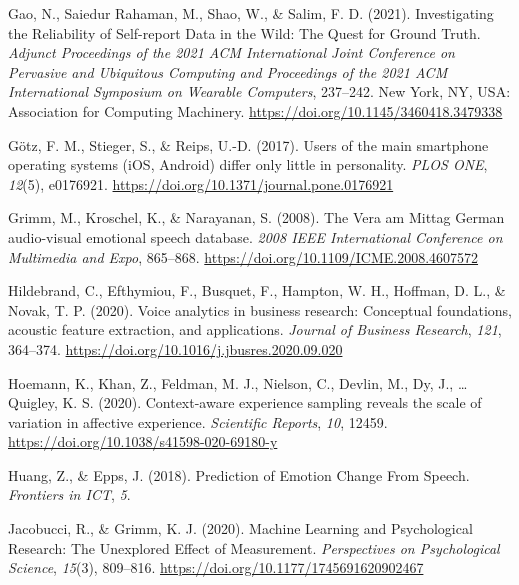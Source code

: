 \documentclass[
  man,floatsintext]{apa6}
\newlength{\cslhangindent}
\newlength{\cslentryspacingunit} %
\newenvironment{CSLReferences}[2] %
 {%
  \setlength{\parindent}{0pt}
  \ifodd #1
  \let\oldpar\par
  \def\par{\hangindent=\cslhangindent\oldpar}
  \fi
  \setlength{\parskip}{#2\cslentryspacingunit}
 }%
 {}
\begin{document}
\begin{CSLReferences}{1}{0}
\leavevmode{}%
Gao, N., Saiedur Rahaman, M., Shao, W., \& Salim, F. D. (2021). Investigating the {Reliability} of {Self-report Data} in the {Wild}: {The Quest} for {Ground Truth}. \emph{Adjunct {Proceedings} of the 2021 {ACM International Joint Conference} on {Pervasive} and {Ubiquitous Computing} and {Proceedings} of the 2021 {ACM International Symposium} on {Wearable Computers}}, 237--242. {New York, NY, USA}: {Association for Computing Machinery}. \url{https://doi.org/10.1145/3460418.3479338}

\leavevmode{}%
Götz, F. M., Stieger, S., \& Reips, U.-D. (2017). Users of the main smartphone operating systems ({iOS}, {Android}) differ only little in personality. \emph{PLOS ONE}, \emph{12}(5), e0176921. \url{https://doi.org/10.1371/journal.pone.0176921}

\leavevmode{}%
Grimm, M., Kroschel, K., \& Narayanan, S. (2008). The {Vera} am {Mittag German} audio-visual emotional speech database. \emph{2008 {IEEE International Conference} on {Multimedia} and {Expo}}, 865--868. \url{https://doi.org/10.1109/ICME.2008.4607572}

\leavevmode{}%
Hildebrand, C., Efthymiou, F., Busquet, F., Hampton, W. H., Hoffman, D. L., \& Novak, T. P. (2020). Voice analytics in business research: {Conceptual} foundations, acoustic feature extraction, and applications. \emph{Journal of Business Research}, \emph{121}, 364--374. \url{https://doi.org/10.1016/j.jbusres.2020.09.020}

\leavevmode{}%
Hoemann, K., Khan, Z., Feldman, M. J., Nielson, C., Devlin, M., Dy, J., \ldots{} Quigley, K. S. (2020). Context-aware experience sampling reveals the scale of variation in affective experience. \emph{Scientific Reports}, \emph{10}, 12459. \url{https://doi.org/10.1038/s41598-020-69180-y}

\leavevmode{}%
Huang, Z., \& Epps, J. (2018). Prediction of {Emotion Change From Speech}. \emph{Frontiers in ICT}, \emph{5}.

\leavevmode{}%
Jacobucci, R., \& Grimm, K. J. (2020). Machine {Learning} and {Psychological Research}: {The Unexplored Effect} of {Measurement}. \emph{Perspectives on Psychological Science}, \emph{15}(3), 809--816. \url{https://doi.org/10.1177/1745691620902467}


\end{CSLReferences}
\end{document}
